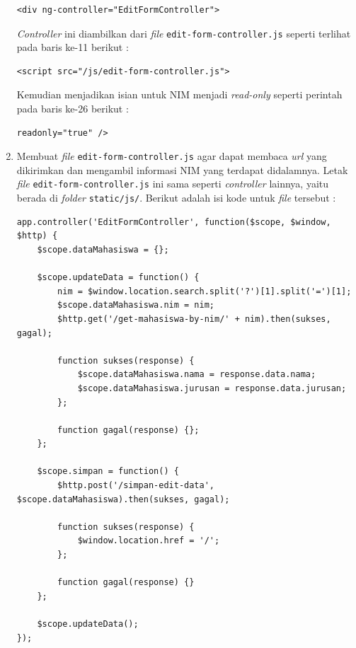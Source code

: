 \begin{enumerate}
	\begin{lstlisting}[firstnumber=18]
	<div ng-controller="EditFormController">\end{lstlisting}
	
	\textit{Controller} ini diambilkan dari \textit{file} \texttt{edit-form-controller.js} seperti terlihat pada baris ke-11 berikut :
	
	\begin{lstlisting}[firstnumber=11]
	<script src="/js/edit-form-controller.js"> \end{lstlisting}
	
	Kemudian menjadikan isian untuk NIM menjadi \textit{read-only} seperti perintah pada baris ke-26 berikut :
	
	\begin{lstlisting}[firstnumber=26]
	readonly="true" /> \end{lstlisting}
	
	\item Membuat \textit{file} \texttt{edit-form-controller.js} agar dapat membaca \textit{url} yang dikirimkan dan mengambil informasi NIM yang terdapat didalamnya. Letak \textit{file} \texttt{edit-form-controller.js} ini sama seperti \textit{controller} lainnya, yaitu berada di \textit{folder} \texttt{static/js/}. Berikut adalah isi kode untuk \textit{file} tersebut :
	
	\begin{lstlisting}
app.controller('EditFormController', function($scope, $window, $http) {
    $scope.dataMahasiswa = {};
    
    $scope.updateData = function() {
        nim = $window.location.search.split('?')[1].split('=')[1];
        $scope.dataMahasiswa.nim = nim;
        $http.get('/get-mahasiswa-by-nim/' + nim).then(sukses, gagal);
        
        function sukses(response) {
            $scope.dataMahasiswa.nama = response.data.nama;
            $scope.dataMahasiswa.jurusan = response.data.jurusan;
        };
        
        function gagal(response) {};
    };
    
    $scope.simpan = function() {
        $http.post('/simpan-edit-data', $scope.dataMahasiswa).then(sukses, gagal);
        
        function sukses(response) {
            $window.location.href = '/';
        };
        
        function gagal(response) {}
    };
    
    $scope.updateData();
});
	\end{lstlisting}
	

\end{enumerate}
